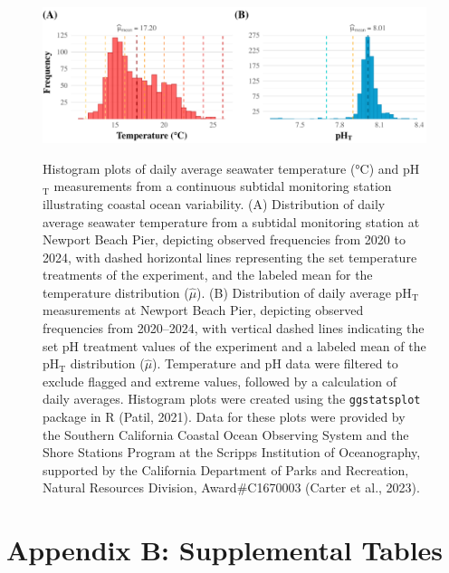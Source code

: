 \documentclass{CSUNthesis}
\begin{document}
\begin{figure}[H]
\centering
\caption[Histogram plots of seawater temperature and pH$_\mathrm{T}$.]{Histogram plots of daily average seawater temperature (°C) and pH$_\mathrm{T}$ measurements from a continuous subtidal monitoring station illustrating coastal ocean variability. (A) Distribution of daily average seawater temperature from a subtidal monitoring station at Newport Beach Pier, depicting observed frequencies from 2020 to 2024, with dashed horizontal lines representing the set temperature treatments of the experiment, and the labeled mean for the temperature distribution ($\hat{\mu}$). (B) Distribution of daily average pH$_\mathrm{T}$ measurements at Newport Beach Pier, depicting observed frequencies from 2020–2024, with vertical dashed lines indicating the set pH treatment values of the experiment and a labeled mean of the pH$_\mathrm{T}$ distribution ($\hat{\mu}$). Temperature and pH data were filtered to exclude flagged and extreme values, followed by a calculation of daily averages. Histogram plots were created using the \texttt{ggstatsplot} package in R (Patil, 2021). Data for these plots were provided by the Southern California Coastal Ocean Observing System and the Shore Stations Program at the Scripps Institution of Oceanography, supported by the California Department of Parks and Recreation, Natural Resources Division, Award\#C1670003 (Carter et al., 2023).}
\includegraphics[width=5in]{figures/appendix/Appendix_1_SST_pH.png}
\label{fig:appendixA1}
\end{figure}

\chapter*{Appendix B: Supplemental Tables}\label{appendix-b-supplemental-tables}

\setcounter{table}{0}
\renewcommand{\thetable}{B\arabic{table}}
\end{document}

